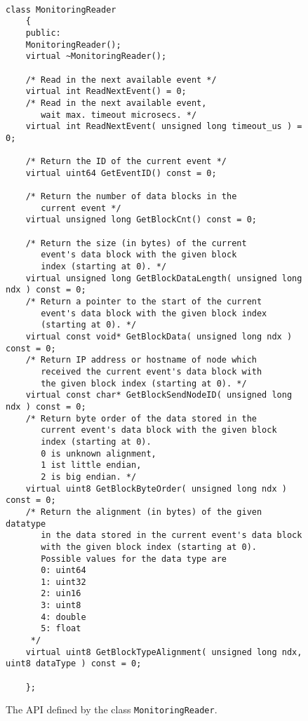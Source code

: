 \documentclass[a4paper,twoside]{article}
\begin{document}
\begin{figure}[hbt]
{\footnotesize
\begin{verbatim}

class MonitoringReader
    {
    public:
    MonitoringReader();
    virtual ~MonitoringReader();
    
    /* Read in the next available event */
    virtual int ReadNextEvent() = 0;
    /* Read in the next available event, 
       wait max. timeout microsecs. */
    virtual int ReadNextEvent( unsigned long timeout_us ) = 0;

    /* Return the ID of the current event */
    virtual uint64 GetEventID() const = 0;

    /* Return the number of data blocks in the 
       current event */
    virtual unsigned long GetBlockCnt() const = 0;

    /* Return the size (in bytes) of the current 
       event's data block with the given block 
       index (starting at 0). */
    virtual unsigned long GetBlockDataLength( unsigned long ndx ) const = 0;
    /* Return a pointer to the start of the current
       event's data block with the given block index
       (starting at 0). */
    virtual const void* GetBlockData( unsigned long ndx ) const = 0;
    /* Return IP address or hostname of node which
       received the current event's data block with
       the given block index (starting at 0). */
    virtual const char* GetBlockSendNodeID( unsigned long ndx ) const = 0;
    /* Return byte order of the data stored in the 
       current event's data block with the given block 
       index (starting at 0). 
       0 is unknown alignment, 
       1 ist little endian, 
       2 is big endian. */
    virtual uint8 GetBlockByteOrder( unsigned long ndx ) const = 0;
    /* Return the alignment (in bytes) of the given datatype 
       in the data stored in the current event's data block
       with the given block index (starting at 0). 
       Possible values for the data type are
       0: uint64
       1: uint32
       2: uin16
       3: uint8
       4: double
       5: float
     */
    virtual uint8 GetBlockTypeAlignment( unsigned long ndx, uint8 dataType ) const = 0;
    
    };

\end{verbatim}
}
\parbox{0.90\columnwidth}{
\caption{\label{Fig:MonitoringReader}The API defined by the class \texttt{MonitoringReader}.}
}
\end{figure}
\end{document}
